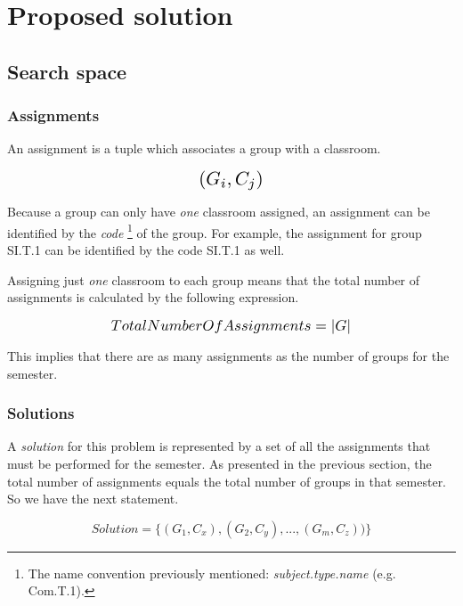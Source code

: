 \renewcommand{\documentname}{Proposed solution}

\chapter{Proposed solution}


\section{Search space}


\subsection{Assignments}

An assignment is a tuple which associates a group with a classroom.

\begin{equation}
    \scalebox{1.5}{$(G_{i}, C_{j})$}
\end{equation}

Because a group can only have \textit{one} classroom assigned, an assignment can be identified by the \textit{code} \footnote{The name convention previously mentioned: \textit{subject.type.name} (e.g. Com.T.1).} of the group. For example, the assignment for group SI.T.1 can be identified by the code SI.T.1 as well.

Assigning just \textit{one} classroom to each group means that the total number of assignments is calculated by the following expression.

\begin{equation}
    \scalebox{1.2}{$TotalNumberOfAssignments = \left|G\right|$}
\end{equation}

This implies that there are as many assignments as the number of groups for the semester.

\subsection{Solutions}

A \textit{solution} for this problem is represented by a set of all the assignments that must be performed for the semester. As presented in the previous section, the total number of assignments equals the total number of groups in that semester. So we have the next statement.

\begin{equation}
    Solution = \{ (G_{1}, C_{x}), (G_{2}, C_{y}), ..., (G_{m}, C_{z})) \}
\end{equation}

